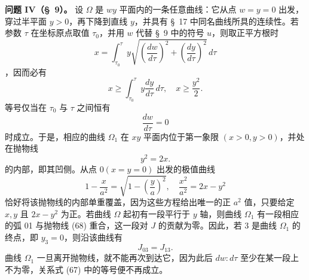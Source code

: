 \documentclass[11pt,a4paper,leqno]{article}
\begin{document}
\noindent\textbf{问题 IV（\S~9）。} 设 $\Omega$ 是 $wy$ 平面内的一条任意曲线：它从点 $w=y=0$ 出发，穿过半平面 $y>0$，再下降到直线 $y$，并具有 \S~17 中同名曲线所具的连续性。若参数 $\tau$ 在坐标原点取值 $\tau_0$，并用 $w$ 代替 \S~9 中的符号 $u$，则取正平方根时
\begin{equation}\tag{66}
x=\int_{\tau_0}^{\tau}
y\sqrt{\left(\frac{dw}{d\tau}\right)^2+\left(\frac{dy}{d\tau}\right)^2}\,d\tau
\end{equation}
，因而必有
\begin{equation}\tag{67}
x\geq \int_{\tau_0}^{\tau}y\frac{dy}{d\tau}\,d\tau,\quad
x\geq \frac{y^2}{2}.
\end{equation}
等号仅当在 $\tau_0$ 与 $\tau$ 之间恒有
\[
\frac{dw}{d\tau}=0
\]
时成立。于是，相应的曲线 $\Omega_1$ 在 $xy$ 平面内位于第一象限 $(x>0,y>0)$，并处在抛物线
\begin{equation}\tag{68}
y^2=2x.
\end{equation}
的内部，即其凹侧。从点 $0(x=y=0)$ 出发的极值曲线
\begin{equation}\tag{69}
1-\frac{x}{a^2}
=
\sqrt{1-\left(\frac{y}{a}\right)^2},\quad
\frac{x^2}{a^2}=2x-y^2
\end{equation}
恰好将该抛物线的内部单重覆盖，因为这些方程给出唯一的正 $a^2$ 值，只要给定 $x,y$ 且
$2x-y^2$ 为正。若曲线 $\Omega$ 起初有一段平行于 $y$ 轴，则曲线 $\Omega_1$ 有一段相应的弧 01 与抛物线 (68) 重合，这一段对 $J$ 的贡献为零。因此，若 3 是曲线 $\Omega_1$ 的终点，即 $y_3=0$，则沿该曲线有
\begin{equation}\tag{70}
J_{03}=J_{13}.
\end{equation}
曲线 $\Omega_1$ 一旦离开抛物线，就不能再次到达它，因为此后 $dw:d\tau$ 至少在某一段上不为零，关系式 (67) 中的等号便不再成立。
\end{document}
